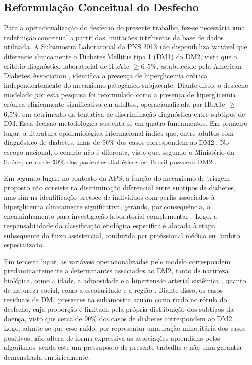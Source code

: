 \subsection{Reformulação Conceitual do Desfecho}
Para a operacionalização do desfecho do presente trabalho, fez-se necessária uma redefinição conceitual a partir das limitações intrínsecas da base de dados utilizada. A Subamostra Laboratorial da PNS 2013 não disponibiliza variável que diferencie clinicamente o Diabetes Mellitus tipo 1 (DM1) do DM2, visto que o critério diagnóstico laboratorial de HbA1c $\geq 6,5$\%, estabelecido pela American Diabetes Association \cite{ADA2010}, identifica a presença de hiperglicemia crônica independentemente do mecanismo patogênico subjacente.
Diante disso, o desfecho modelado por esta pesquisa foi reformulado como a presença de hiperglicemia crônica clinicamente significativa em adultos, operacionalizada por HbA1c $\geq$ 6,5\%, em detrimento da tentativa de discriminação diagnóstica entre subtipos de DM. Essa decisão metodológica sustenta-se em quatro fundamentos.
Em primeiro lugar, a literatura epidemiológica internacional indica que, entre adultos com diagnóstico de diabetes, mais de 90\% dos casos correspondem ao DM2 \cite{who2024diabetes}. No escopo nacional, o cenário não é diferente, visto que, segundo o Ministério da Saúde, cerca de 90\% dos pacientes diabéticos no Brasil possuem DM2 \cite{brasil2024diabetes}.

Em segundo lugar, no contexto da APS, a função do mecanismo de triagem proposto não consiste na discriminação diferencial entre subtipos de diabetes, mas sim na identificação precoce de indivíduos com perfis associados à hiperglicemia clinicamente significativa, gerando, por consequência, o encaminhamento para investigação laboratorial complementar \cite{brasil2013}. Logo, a responsabilidade da classificação etiológica específica é alocada à etapa subsequente do fluxo assistencial, conduzida por profissional médico em âmbito especializado.

Em terceiro lugar, as variáveis operacionalizadas pelo modelo correspondem predominantemente a determinantes associados ao DM2, tanto de natureza biológica, como a idade, a adiposidade e a hipertensão arterial sistêmica \cite{mlynarska2025type}, quanto de natureza social, como a escolaridade e a região \cite{deAlmeida-Pititto09112015}. Diante disso, os casos residuais de DM1 presentes na subamostra atuam como ruído no rótulo do desfecho, cuja proporção é limitada pela própria distribuição dos subtipos da doença, visto que cerca de 90\% dos casos de diabetes correspondem ao DM2 \cite{who2024diabetes, brasil2024diabetes}. Logo, admite-se que esse ruído, por representar uma fração minoritária dos casos positivos, não altera de forma expressiva as associações aprendidas pelos algoritmos, sendo este um pressuposto do presente trabalho e não uma garantia demonstrada empiricamente.

